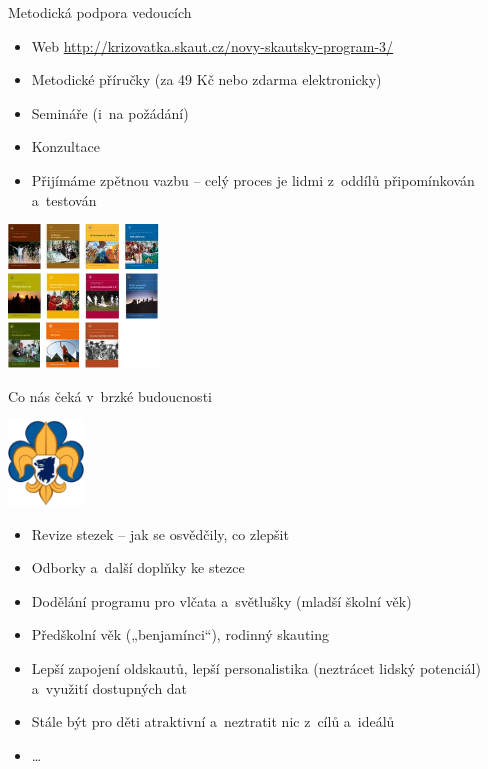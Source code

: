 \documentclass[compress,xelatex,xcolor=dvipsnames,print]{beamer}
\begin{document}
\begin{frame}{Metodická podpora vedoucích}
\begin{itemize}
\item Web \href{http://krizovatka.skaut.cz/novy-skautsky-program-3/}{http://krizovatka.skaut.cz/novy-skautsky-program-3/}
\item Metodické příručky (za 49 Kč nebo zdarma elektronicky)
\item Semináře (i~na  požádání)
\item Konzultace
\item Přijímáme zpětnou vazbu -- celý proces je lidmi z~oddílů připomínkován a~testován
\end{itemize}
\begin{center}
\includegraphics[width=4cm]{prirucky.png}
\end{center}
\end{frame}

\begin{frame}{Co nás čeká v~brzké budoucnosti}
\begin{center}
\includegraphics[width=2cm]{lilie-cz.png}
\end{center}
\begin{itemize}
 \item Revize stezek -- jak se osvědčily, co zlepšit
 \item Odborky a~další doplňky ke stezce
 \item Dodělání programu pro vlčata a~světlušky (mladší školní věk)
 \item Předškolní věk („benjamínci“), rodinný skauting
 \item Lepší zapojení oldskautů, lepší personalistika (neztrácet lidský potenciál) a~využití dostupných dat
 \item Stále být pro děti atraktivní a~neztratit nic z~cílů a~ideálů
 \item \ldots
\end{itemize}
\end{frame}
\end{document}
